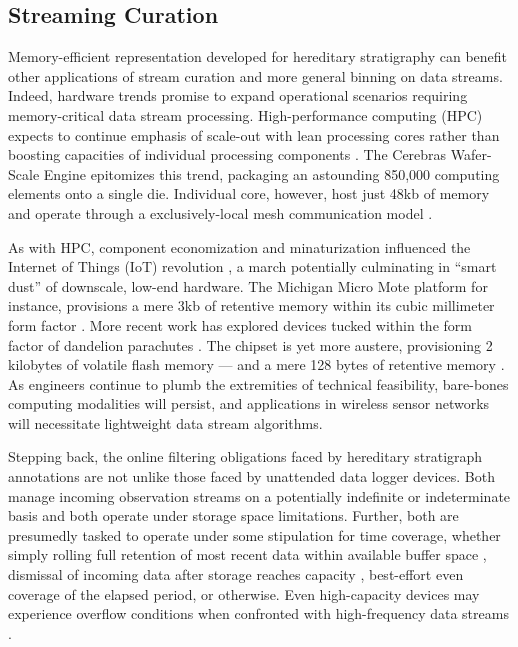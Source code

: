 \subsection{Streaming Curation}

Memory-efficient representation developed for hereditary stratigraphy can benefit other applications of stream curation and more general binning on data streams.
Indeed, hardware trends promise to expand operational scenarios requiring memory-critical data stream processing.
High-performance computing (HPC) expects to continue emphasis of scale-out with lean processing cores rather than boosting capacities of individual processing components \citep{sutter2005free,morgenstern2021unparalleled}.
The Cerebras Wafer-Scale Engine epitomizes this trend, packaging an astounding 850,000 computing elements onto a single die.
Individual core, however, host just 48kb of memory and operate through a exclusively-local mesh communication model \citep{cerebras2021wafer,lauterbach2021path}.

As with HPC, component economization and minaturization influenced the Internet of Things (IoT) revolution \citep{rfc7228,ojo2018review}, a march potentially culminating in ``smart dust'' \citep{warneke2001smart} of downscale, low-end hardware.
The Michigan Micro Mote platform for instance, provisions a mere 3kb of retentive memory within its cubic millimeter form factor \citep{lee2012modular}.
More recent work has explored devices tucked within the form factor of dandelion parachutes \citep{iyer2022wind}.
The chipset is yet more austere, provisioning 2 kilobytes of volatile flash memory --- and a mere 128 bytes of retentive memory \citep{microchip2014atiny20}.
As engineers continue to plumb the extremities of technical feasibility, bare-bones computing modalities will persist, and applications in wireless sensor networks will necessitate lightweight data stream algorithms.

Stepping back, the online filtering obligations faced by hereditary stratigraph annotations are not unlike those faced by unattended data logger devices.
Both manage incoming observation streams on a potentially indefinite or indeterminate basis and both operate under storage space limitations.
Further, both are presumedly tasked to operate under some stipulation for time coverage, whether simply rolling full retention of most recent data within available buffer space \citep{fincham1995use}, dismissal of incoming data after storage reaches capacity \citep{saunders1989portable,mahzan2017design}, best-effort even coverage of the elapsed period, or otherwise.
Even high-capacity devices may experience overflow conditions when confronted with high-frequency data streams \citep{luharuka2003design}.

